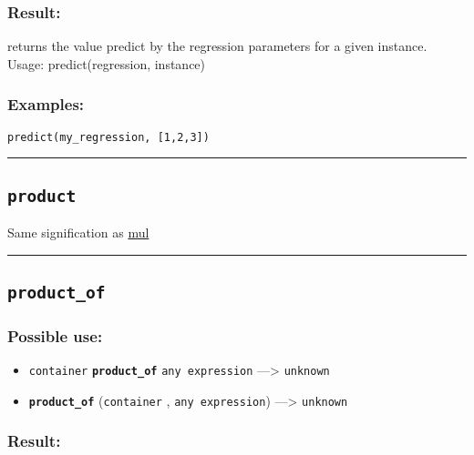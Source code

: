 \documentclass[]{book}
\providecommand{\tightlist}{%
  \setlength{\itemsep}{0pt}\setlength{\parskip}{0pt}}
\theoremstyle{definition}
\theoremstyle{definition}
\theoremstyle{definition}
\theoremstyle{remark}
\begin{document}
\subsubsection{Result:}\label{result-403}

returns the value predict by the regression parameters for a given
instance. Usage: predict(regression, instance)

\subsubsection{Examples:}\label{examples-290}

\begin{verbatim}
predict(my_regression, [1,2,3]) 
\end{verbatim}

\begin{center}\rule{0.5\linewidth}{\linethickness}\end{center}

\subsection{\texorpdfstring{\texttt{product}}{product}}\label{product}

Same signification as \href{operators-i-to-m.html\#mul}{mul}

\begin{center}\rule{0.5\linewidth}{\linethickness}\end{center}

\subsection{\texorpdfstring{\texttt{product\_of}}{product\_of}}\label{product_of}

\subsubsection{Possible use:}\label{possible-use-418}

\begin{itemize}
\tightlist
\item
  \texttt{container} \textbf{\texttt{product\_of}}
  \texttt{any\ expression} ---\textgreater{} \texttt{unknown}
\item
  \textbf{\texttt{product\_of}} (\texttt{container} ,
  \texttt{any\ expression}) ---\textgreater{} \texttt{unknown}
\end{itemize}

\subsubsection{Result:}\label{result-404}
\end{document}
